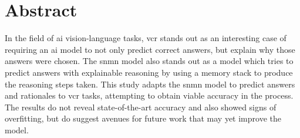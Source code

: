 \chapter*{Abstract}

In the field of \gls{ai} vision-language tasks, \gls{vcr} stands out as an interesting case of requiring an \gls{ai} model to not only predict correct answers, but explain why those answers were chosen.
The \gls{snmn} model also stands out as a model which tries to predict answers with explainable reasoning by using a memory stack to produce the reasoning steps taken.
This study adapts the \gls{snmn} model to predict answers and rationales to \gls{vcr} tasks, attempting to obtain viable accuracy in the process.
The results do not reveal state-of-the-art accuracy and also showed signs of overfitting, but do suggest avenues for future work that may yet improve the model.
